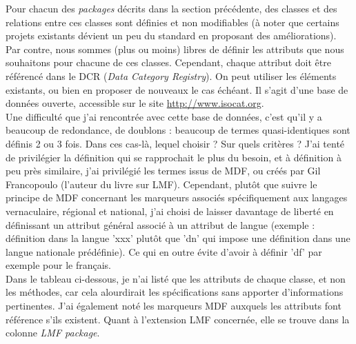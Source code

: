\documentclass[a4paper,12pt]{article}
\begin{document}
Pour chacun des \textit{packages} d\'ecrits dans la section pr\'ec\'edente, des classes et des relations entre ces classes sont d\'efinies et non modifiables (\`a noter que certains projets existants d\'evient un peu du standard en proposant des am\'eliorations). Par contre, nous sommes (plus ou moins) libres de d\'efinir les attributs que nous souhaitons pour chacune de ces classes. Cependant, chaque attribut doit \^etre r\'ef\'erenc\'e dans le DCR (\textit{Data Category Registry}). On peut utiliser les \'el\'ements existants, ou bien en proposer de nouveaux le cas \'ech\'eant. Il s'agit d'une base de donn\'ees ouverte, accessible sur le site \url{http://www.isocat.org}.\\
Une difficult\'e que j'ai rencontr\'ee avec cette base de donn\'ees, c'est qu'il y a beaucoup de redondance, de doublons : beaucoup de termes quasi-identiques sont d\'efinis 2 ou 3 fois. Dans ces cas-l\`a, lequel choisir ? Sur quels crit\`eres ? J'ai tent\'e de privil\'egier la d\'efinition qui se rapprochait le plus du besoin, et \`a d\'efinition \`a peu pr\`es similaire, j'ai privil\'egi\'e les termes issus de MDF, ou cr\'e\'es par Gil Francopoulo (l'auteur du livre sur LMF). Cependant, plut\^ot que suivre le principe de MDF concernant les marqueurs associ\'es sp\'ecifiquement aux langages vernaculaire, r\'egional et national, j'ai choisi de laisser davantage de libert\'e en définissant un attribut g\'en\'eral associ\'e \`a un attribut de langue (exemple : d\'efinition dans la langue 'xxx' plut\^ot que 'dn' qui impose une d\'efinition dans une langue nationale pr\'ed\'efinie). Ce qui en outre \'evite d'avoir \`a d\'efinir 'df' par exemple pour le fran\c{c}ais.\\

Dans le tableau ci-dessous, je n'ai list\'e que les attributs de chaque classe, et non les m\'ethodes, car cela alourdirait les sp\'ecifications sans apporter d'informations pertinentes. J'ai \'egalement not\'e les marqueurs MDF auxquels les attributs font r\'ef\'erence s'ils existent. Quant \`a l'extension LMF concern\'ee, elle se trouve dans la colonne \textit{LMF package}.

\pagebreak
\end{document}
